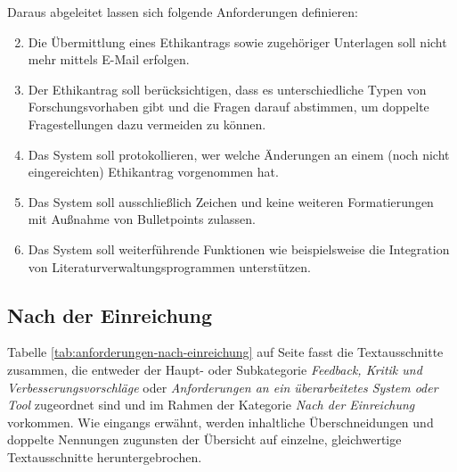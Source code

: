 \documentclass[a4paper,12pt,twoside,numbers=noendperiod]{scrreprt}
\begin{document}
Daraus abgeleitet lassen sich folgende Anforderungen definieren:
\begin{enumerate}[label=\textbf{\#\arabic*}]
    \setcounter{enumi}{1}
    \item Die Übermittlung eines Ethikantrags sowie zugehöriger Unterlagen soll nicht mehr mittels E-Mail erfolgen.
    \item Der Ethikantrag soll berücksichtigen, dass es unterschiedliche Typen von Forschungsvorhaben gibt und die Fragen darauf abstimmen, um doppelte Fragestellungen dazu vermeiden zu können.
    \item Das System soll protokollieren, wer welche Änderungen an einem (noch nicht eingereichten) Ethikantrag vorgenommen hat.
    \item Das System soll ausschließlich Zeichen und keine weiteren Formatierungen mit Außnahme von Bulletpoints zulassen.
    \item Das System soll weiterführende Funktionen wie beispielsweise die Integration von Literaturverwaltungsprogrammen unterstützen.
\end{enumerate}

\subsection{Nach der Einreichung}
\label{sub-sec:nach-einreichung}

Tabelle \ref{tab:anforderungen-nach-einreichung} auf Seite \pageref{tab:anforderungen-nach-einreichung} fasst die Textausschnitte zusammen, die entweder der Haupt- oder Subkategorie \textit{Feedback, Kritik und Verbesserungsvorschläge} oder \textit{Anforderungen an ein überarbeitetes System oder Tool} zugeordnet sind und im Rahmen der Kategorie \textit{Nach der Einreichung} vorkommen. Wie eingangs erwähnt, werden inhaltliche Überschneidungen und doppelte Nennungen zugunsten der Übersicht auf einzelne, gleichwertige Textausschnitte heruntergebrochen.
\end{document}

